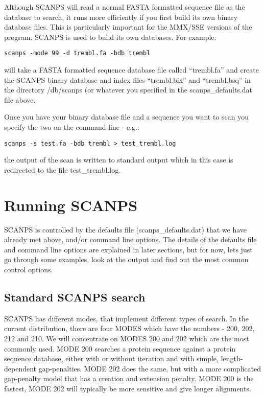 \documentclass[12pt]{article}
\begin{document}
Although SCANPS will read a normal FASTA
formatted sequence file as the database to search, it runs more
efficiently if you first build its own binary database files.  This is
particularly important for the MMX/SSE versions of the program.
SCANPS is used to build its own databases.  For example:

\begin{verbatim}
scanps -mode 99 -d trembl.fa -bdb trembl
\end{verbatim}

will take a FASTA formatted sequence database file called ``trembl.fa''
and create the SCANPS binary database and index files ``trembl.bix''
and ``trembl.bsq'' in the directory /db/scanps (or whatever you
specified in the scanps\_defaults.dat file above.

Once you have your binary database file and a sequence you want to
scan you specify the two on the command line - e.g.:

\begin{verbatim}
scanps -s test.fa -bdb trembl > test_trembl.log
\end{verbatim}

the output of the scan is written to standard output which in this
case is redirected to the file test\_trembl.log.

\section{Running SCANPS}

SCANPS is controlled by the defaults file (scanps\_defaults.dat) that
we have already met above, and/or command line options.  The details
of the defaults file and command line options are explained in later
sections, but for now, lets just go through some examples, look at the
output and find out the most common control options.

\subsection{Standard SCANPS search}

SCANPS has different modes, that implement different types of search.
In the current distribution, there are four MODES which have the
numbers - 200, 202, 212 and 210.  We will concentrate on MODES 200 and
202 which are the most commonly used.  MODE 200 searches a protein
sequence against a protein sequence database, either with or without
iteration and with simple, length-dependent gap-penalties.  MODE 202
does the same, but with a more complicated gap-penalty model that has
a creation and extension penalty.  MODE 200 is the fastest, MODE 202
will typically be more sensitive and give longer alignments.
\end{document}
